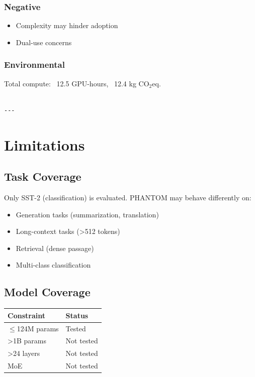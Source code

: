 \subsubsection{Negative}
\begin{itemize}
\item Complexity may hinder adoption
\item Dual-use concerns

\end{itemize}
\subsubsection{Environmental}
Total compute: ~12.5 GPU-hours, ~12.4 kg CO$_2$eq.
\begin{lstlisting}

---
\end{lstlisting}


\section{Limitations}

\subsection{Task Coverage}

Only SST-2 (classification) is evaluated. PHANTOM may behave differently on:
\begin{itemize}
\item Generation tasks (summarization, translation)
\item Long-context tasks (>512 tokens)
\item Retrieval (dense passage)
\item Multi-class classification

\end{itemize}
\subsection{Model Coverage}

\begin{table}[H]
\centering
\small
\begin{tabular}{ll}
\toprule
\textbf{Constraint} & \textbf{Status} \\
\midrule
$\le$124M params & Tested \\
>1B params & Not tested \\
>24 layers & Not tested \\
MoE & Not tested \\
\bottomrule
\end{tabular}
\end{table}

